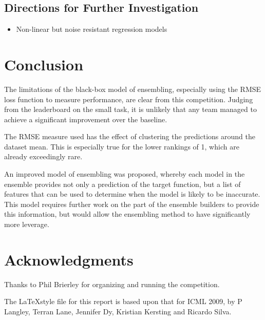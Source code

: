 \documentclass{article}
\begin{document}
\subsection{Directions for Further Investigation}

\begin{itemize}
\item Non-linear but noise resistant regression models
\end{itemize}


\section{Conclusion}

The limitations of the black-box model of ensembling, especially using the RMSE loss function to measure performance, are clear from this competition.  Judging from the leaderboard on the small task, it is unlikely that any team managed to achieve a significant improvement over the baseline.

The RMSE measure used has the effect of clustering the predictions around the dataset mean.  This is especially true for the lower rankings of 1, which are already exceedingly rare.

An improved model of ensembling was proposed, whereby each model in the ensemble provides not only a prediction of the target function, but a list of features that can be used to determine when the model is likely to be inaccurate.  This model requires further work on the part of the ensemble builders to provide this information, but would allow the ensembling method to have significantly more leverage.

\section*{Acknowledgments} 

Thanks to Phil Brierley for organizing and running the competition.

The \LaTeX style file for this report is based upon that for ICML 2009, by P Langley, Terran Lane, Jennifer Dy, Kristian Kersting and Ricardo Silva.




\end{document}
